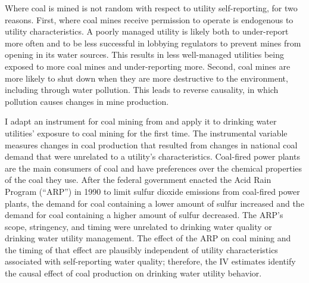 \documentclass[12pt]{article}
\begin{document}
Where coal is mined is not random with respect to utility self-reporting, for two reasons. First, where coal mines receive permission to operate is endogenous to utility characteristics. A poorly managed utility is likely both to under-report more often and to be less successful in lobbying regulators to prevent mines from opening in its water sources. This results in less well-managed utilities being exposed to more coal mines and under-reporting more. Second, coal mines are more likely to shut down when they are more destructive to the environment, including through water pollution. This leads to reverse causality, in which pollution causes changes in mine production.

I adapt an instrument for coal mining from \textcite{stratford2015coalprod} and apply it to drinking water utilities' exposure to coal mining for the first time. The instrumental variable measures changes in coal production that resulted from changes in national coal demand that were unrelated to a utility's characteristics. Coal-fired power plants are the main consumers of coal and have preferences over the chemical properties of the coal they use. After the federal government enacted the Acid Rain Program (``ARP'') in 1990 to limit sulfur dioxide emissions from coal-fired power plants, the demand for coal containing a lower amount of sulfur increased and the demand for coal containing a higher amount of sulfur decreased. The ARP's scope, stringency, and timing were unrelated to drinking water quality or drinking water utility management. The effect of the ARP on coal mining and the timing of that effect are plausibly independent of utility characteristics associated with self-reporting water quality; therefore, the IV estimates identify the causal effect of coal production on drinking water utility behavior.
\end{document}
